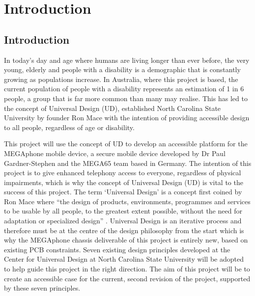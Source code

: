 
\chapter{Introduction}\label{chapter:firstchapter} %

\label{Chapter1} %


\section{Introduction}\label{sec:firstsection}

In today's day and age where humans are living longer than ever before, the very young, elderly and people with a disability is a demographic that is constantly growing as populations increase.
In Australia, where this project is based, the current population of people with a disability represents an estimation of 1 in 6 people\cite{ausstats}, a group that is far more common than many may realise.
This has led to the concept of Universal Design (UD), established North Carolina State University by founder Ron Mace with the intention of providing accessible design to all people, regardless of age or disability.

This project will use the concept of UD to develop an accessible platform for the MEGAphone mobile device, a secure mobile device developed by Dr Paul Gardner-Stephen and the MEGA65 team based in Germany.
The intention of this project is to give enhanced telephony access to everyone, regardless of physical impairments, which is why the concept of Universal Design (UD) is vital to the success of this project. 
The term ‘Universal Design’ is a concept first coined by Ron Mace where “the design of products, environments, programmes and services to be usable by all people, to the greatest extent possible, without the need for adaptation or specialized design” \cite{nda}. 
Universal Design is an iterative process and therefore must be at the centre of the design philosophy from the start \cite{incldesign} which is why the MEGAphone chassis deliverable of this project is entirely new, based on existing PCB constraints.
Seven existing design principles developed at the Center for Universal Design at North Carolina State University \cite{sevenprinciples} will be adopted to help guide this project in the right direction.
The aim of this project will be to create an accessible case for the current, second revision of the project, supported by these seven principles.


